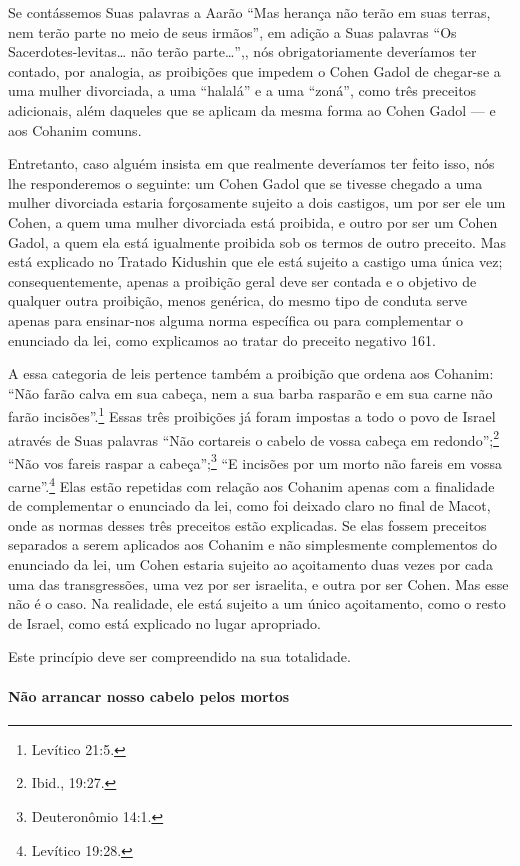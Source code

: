 Se contássemos Suas palavras a Aarão ``Mas herança não terão em suas
terras, nem terão parte no meio de seus irmãos'', em adição a Suas
palavras ``Os Sacerdotes-levitas\ldots{} não terão parte\ldots{}'',, nós
obrigatoriamente deveríamos ter contado, por analogia, as proibições
que impedem o Cohen Gadol de chegar-se a uma mulher divorciada, a
uma ``halalá'' e a uma ``zoná'', como três preceitos adicionais, além
daqueles que se aplicam da mesma forma ao Cohen Gadol --- e aos
Cohanim comuns.

Entretanto, caso alguém insista em que realmente deveríamos ter feito
isso, nós lhe responderemos o seguinte: um Cohen
Gadol que se tivesse chegado a uma mulher divorciada estaria
forçosamente sujeito a dois castigos, um por ser ele um Cohen, a
quem uma mulher divorciada está proibida, e outro por ser um Cohen
Gadol, a quem ela está igualmente proibida sob os termos de outro
preceito. Mas está explicado no Tratado Kidushin que ele está sujeito a
castigo uma única vez; consequentemente, apenas a proibição geral deve
ser contada e o objetivo de qualquer outra proibição, menos genérica, do
mesmo tipo de conduta serve apenas para ensinar-nos alguma norma
específica ou para complementar o enunciado da lei, como explicamos ao
tratar do preceito negativo 161.

A essa categoria de leis pertence também a proibição que ordena aos
Cohanim: ``Não farão calva em sua cabeça, nem a sua barba rasparão e
em sua carne não farão incisões''.\footnote{Levítico 21:5.} Essas três proibições
já foram impostas a todo o povo de Israel através de Suas palavras
``Não cortareis o cabelo de vossa cabeça em redondo'';\footnote{Ibid., 19:27.}
``Não vos fareis raspar a cabeça'';\footnote{Deuteronômio 14:1.} ``E incisões por
um morto não fareis em vossa carne''.\footnote{Levítico 19:28.} Elas estão
repetidas com relação aos Cohanim apenas com a finalidade de
complementar o enunciado da lei, como foi deixado claro no final de
Macot, onde as normas desses três preceitos estão explicadas. Se elas
fossem preceitos separados a serem aplicados aos Cohanim e não
simplesmente complementos do enunciado da lei, um Cohen estaria
sujeito ao açoitamento duas vezes por cada uma das transgressões, uma
vez por ser israelita, e outra por ser Cohen. Mas esse não é o caso.
Na realidade, ele está sujeito a um único açoitamento, como o resto de
Israel, como está explicado no lugar apropriado.

Este princípio deve ser compreendido na sua totalidade.

\paragraph{Não arrancar nosso cabelo pelos mortos}

